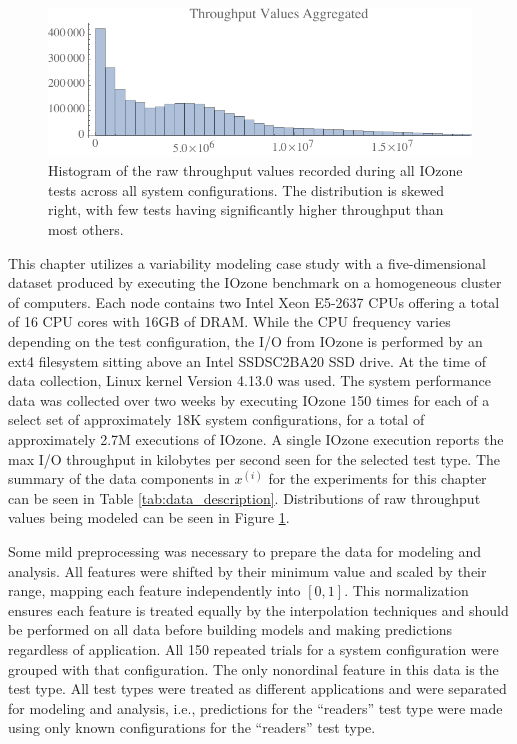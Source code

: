 \begin{figure}
  \centering
  \includegraphics[width=.8\textwidth]{Figures/IEEE/plot-histogram-throughput.pdf}
  \caption{Histogram of the raw throughput values recorded during all IOzone tests across all system configurations. The distribution is skewed right, with few tests having significantly higher throughput than most others.}
  \label{fig:throughput_histogram}
\end{figure}

This chapter utilizes a variability modeling case study with a five-dimensional dataset produced by executing the IOzone benchmark \cite{iozone} on a homogeneous cluster of computers. Each node contains two Intel Xeon E5-2637 CPUs offering a total of 16 CPU cores with 16GB of DRAM. While the CPU frequency varies depending on the test configuration, the I/O from IOzone is performed by an ext4 filesystem sitting above an Intel SSDSC2BA20 SSD drive. At the time of data collection, Linux kernel Version 4.13.0 was used. The system performance data was collected over two weeks by executing IOzone 150 times for each of a select set of approximately 18K system configurations, for a total of approximately 2.7M executions of IOzone. A single IOzone execution reports the max I/O throughput in kilobytes per second seen for the selected test type. The summary of the data components in $x^{(i)}$ for the experiments for this chapter can be seen in Table \ref{tab:data_description}. Distributions of raw throughput values being modeled can be seen in Figure \ref{fig:throughput_histogram}.

Some mild preprocessing was necessary to prepare the data for modeling and analysis. All features were shifted by their minimum value and scaled by their range, mapping each feature independently into $[0,1]$. This normalization ensures each feature is treated equally by the interpolation techniques and should be performed on all data before building models and making predictions regardless of application. All 150 repeated trials for a system configuration were grouped with that configuration. The only nonordinal feature in this data is the test type. All test types were treated as different applications and were separated for modeling and analysis, i.e., predictions for the ``readers'' test type were made using only known configurations for the ``readers'' test type.

